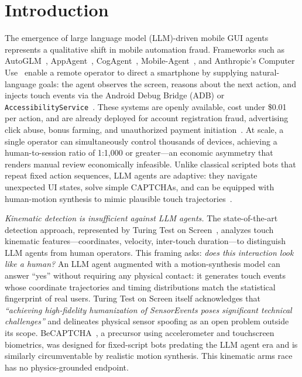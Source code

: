 \section{Introduction}
\label{sec:intro}

The emergence of large language model (LLM)-driven mobile GUI agents represents a qualitative
shift in mobile automation fraud.%
Frameworks such as AutoGLM~\cite{autoglm2024}, AppAgent~\cite{appagent2024},
CogAgent~\cite{cogagent2024}, Mobile-Agent~\cite{mobileagent2024}, and Anthropic's
Computer Use~\cite{anthropiccu2024} enable a remote operator to direct a smartphone by
supplying natural-language goals: the agent observes the screen, reasons about the next
action, and injects touch events via the Android Debug Bridge (ADB) or
\texttt{AccessibilityService}~\cite{a11yabuse2021,dva2024}.%
These systems are openly available, cost under \$0.01 per action, and are already deployed for
account registration fraud, advertising click abuse, bonus farming, and unauthorized payment
initiation~\cite{llmagentfraud2025,clickfraud2021,adffraud2021}.%
At scale, a single operator can simultaneously control thousands of devices, achieving a
human-to-session ratio of 1:1{,}000 or greater---an economic asymmetry that renders
manual review economically infeasible.%
Unlike classical scripted bots that repeat fixed action sequences, LLM agents are adaptive:
they navigate unexpected UI states, solve simple CAPTCHAs, and can be equipped with
human-motion synthesis to mimic plausible touch trajectories~\cite{swipegen2025}.%

\textit{Kinematic detection is insufficient against LLM agents.}%
The state-of-the-art detection approach, represented by Turing Test on Screen~\cite{ttos2026},
analyzes touch kinematic features---coordinates, velocity, inter-touch duration---to distinguish
LLM agents from human operators.%
This framing asks: \textit{does this interaction look like a human?}%
An LLM agent augmented with a motion-synthesis model can answer ``yes'' without requiring
any physical contact: it generates touch events whose coordinate trajectories and timing
distributions match the statistical fingerprint of real users.%
Turing Test on Screen itself acknowledges that \textit{``achieving high-fidelity humanization
of SensorEvents poses significant technical challenges''} and delineates physical sensor
spoofing as an open problem outside its scope.%
BeCAPTCHA~\cite{becaptcha2021}, a precursor using accelerometer and touchscreen biometrics,
was designed for fixed-script bots predating the LLM agent era and is similarly circumventable
by realistic motion synthesis.%
This kinematic arms race has no physics-grounded endpoint.%

